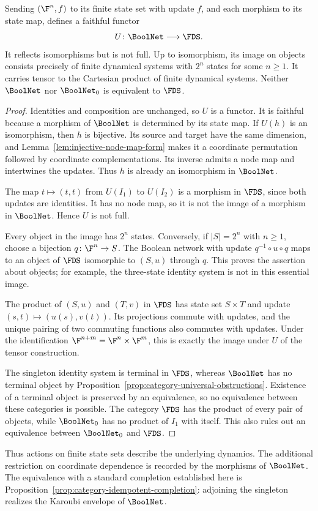 \begin{proposition}\label{prop:category-finite-dynamics}
Sending $(\F^n,f)$ to its finite state set with update $f$, and each morphism to its state map, defines a faithful functor
\[
    U\colon\BoolNet\longrightarrow\FDS.
\]
It reflects isomorphisms but is not full. Up to isomorphism, its image on objects consists precisely of finite dynamical systems with $2^n$ states for some $n\geq1$. It carries tensor to the Cartesian product of finite dynamical systems. Neither $\BoolNet$ nor $\BoolNet_0$ is equivalent to $\FDS$.
\end{proposition}

\begin{proof}
Identities and composition are unchanged, so $U$ is a functor. It is faithful because a morphism of $\BoolNet$ is determined by its state map. If $U(h)$ is an isomorphism, then $h$ is bijective. Its source and target have the same dimension, and Lemma~\ref{lem:injective-node-map-form} makes it a coordinate permutation followed by coordinate complementations. Its inverse admits a node map and intertwines the updates. Thus $h$ is already an isomorphism in $\BoolNet$.

The map $t\mapsto(t,t)$ from $U(I_1)$ to $U(I_2)$ is a morphism in $\FDS$, since both updates are identities. It has no node map, so it is not the image of a morphism in $\BoolNet$. Hence $U$ is not full.

Every object in the image has $2^n$ states. Conversely, if $|S|=2^n$ with $n\geq1$, choose a bijection $q\colon\F^n\to S$. The Boolean network with update $q^{-1}\circ u\circ q$ maps to an object of $\FDS$ isomorphic to $(S,u)$ through $q$. This proves the assertion about objects; for example, the three-state identity system is not in this essential image.

The product of $(S,u)$ and $(T,v)$ in $\FDS$ has state set $S\times T$ and update $(s,t)\mapsto(u(s),v(t))$. Its projections commute with updates, and the unique pairing of two commuting functions also commutes with updates. Under the identification $\F^{n+m}=\F^n\times\F^m$, this is exactly the image under $U$ of the tensor construction.

The singleton identity system is terminal in $\FDS$, whereas $\BoolNet$ has no terminal object by Proposition~\ref{prop:category-universal-obstructions}. Existence of a terminal object is preserved by an equivalence, so no equivalence between these categories is possible. The category $\FDS$ has the product of every pair of objects, while $\BoolNet_0$ has no product of $I_1$ with itself. This also rules out an equivalence between $\BoolNet_0$ and $\FDS$.
\end{proof}

Thus actions on finite state sets describe the underlying dynamics. The additional restriction on coordinate dependence is recorded by the morphisms of $\BoolNet$. The equivalence with a standard completion established here is Proposition~\ref{prop:category-idempotent-completion}: adjoining the singleton realizes the Karoubi envelope of $\BoolNet$.
